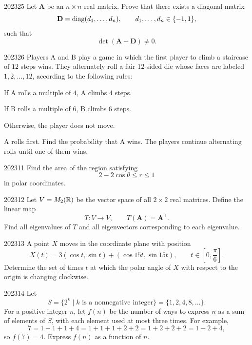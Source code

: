 \begin{problem}{2023}{2}{5}
Let $\mathbf A$ be an $n\times n$ real matrix. Prove that there exists a diagonal matrix
\[
    \mathbf D=\operatorname{diag}(d_1, \dots, d_n),
    \qquad
    d_1, \dots, d_n\in\{-1, 1\},
\]
such that
\[
    \det(\mathbf A+\mathbf D)\ne0.
\]
\end{problem}

\begin{problem}{2023}{2}{6}
Players A and B play a game in which the first player to climb a staircase of $12$ steps wins. They alternately roll a fair $12$-sided die whose faces are labeled $1, 2, \dots, 12$, according to the following rules:
\begin{problemchoices}
    \item If A rolls a multiple of $4$, A climbs $4$ steps.
    \item If B rolls a multiple of $6$, B climbs $6$ steps.
    \item Otherwise, the player does not move.
\end{problemchoices}
A rolls first. Find the probability that A wins. The players continue alternating rolls until one of them wins.
\end{problem}

\begin{problem}{2023}{1}{1}
Find the area of the region satisfying
\[
    2-2\cos\theta\le r\le1
\]
in polar coordinates.
\end{problem}

\begin{problem}{2023}{1}{2}
Let $V=M_2(\mathbb{R})$ be the vector space of all $2\times2$ real matrices. Define the linear map
\[
    T\colon V\to V,
    \qquad
    T(\mathbf A)=\mathbf A^{\mathsf T}.
\]
Find all eigenvalues of $T$ and all eigenvectors corresponding to each eigenvalue.
\end{problem}

\begin{problem}{2023}{1}{3}
A point $X$ moves in the coordinate plane with position
\[
    X(t)=3(\cos t, \sin t)+(\cos15t, \sin15t),
    \qquad
    t\in\left[0, \frac\pi6\right].
\]
Determine the set of times $t$ at which the polar angle of $X$ with respect to the origin is changing clockwise.
\end{problem}

\begin{problem}{2023}{1}{4}
Let
\[
    S=\{2^k\mid k\text{ is a nonnegative integer}\}
    =\{1, 2, 4, 8, \dots\}.
\]
For a positive integer $n$, let $f(n)$ be the number of ways to express $n$ as a sum of elements of $S$, with each element used at most three times. For example,
\[
    7=1+1+1+4
    =1+1+1+2+2
    =1+2+2+2
    =1+2+4,
\]
so $f(7)=4$. Express $f(n)$ as a function of $n$.
\end{problem}

